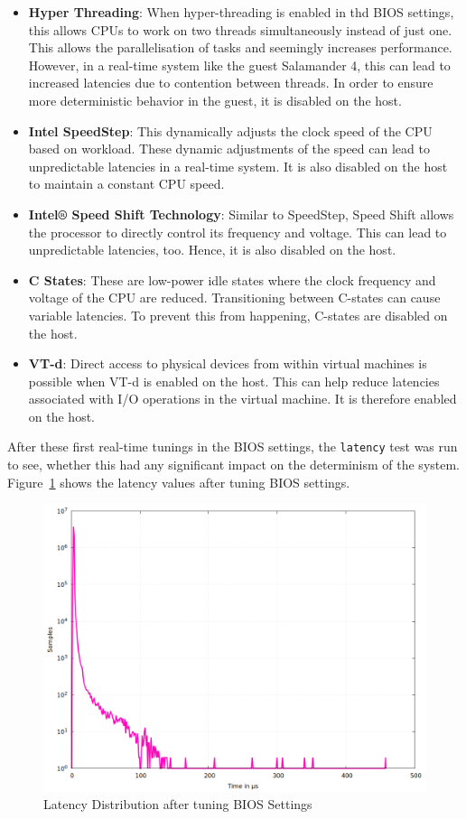 \documentclass[MMR,Master,english]{twbook}
\begin{document}
\begin{itemize}
	\item \textbf{Hyper Threading}: When hyper-threading is enabled in thd BIOS settings, this allows CPUs to work on two threads simultaneously instead of just one. This allows the parallelisation of tasks and seemingly increases performance. However, in a real-time system like the guest Salamander 4, this can lead to increased latencies due to contention between threads. In order to ensure more deterministic behavior in the guest, it is disabled on the host.
	\item \textbf{Intel SpeedStep}: This dynamically adjusts the clock speed of the CPU based on workload. These dynamic adjustments of the speed can lead to unpredictable latencies in a real-time system. It is also disabled on the host to maintain a constant CPU speed.
	\item \textbf{Intel® Speed Shift Technology}: Similar to SpeedStep, Speed Shift allows the processor to directly control its frequency and voltage. This can lead to unpredictable latencies, too. Hence, it is also disabled on the host.
	\item \textbf{C States}: These are low-power idle states where the clock frequency and voltage of the CPU are reduced. Transitioning between C-states can cause variable latencies. To prevent this from happening, C-states are disabled on the host.
	\item \textbf{VT-d}: Direct access to physical devices from within virtual machines is possible when VT-d is enabled on the host. This can help reduce latencies associated with I/O operations in the virtual machine. It is therefore enabled on the host.
\end{itemize}

\noindent After these first real-time tunings in the BIOS settings, the \texttt{latency} test was run to see, whether this had any significant impact on the determinism of the system. Figure~\ref{fig:gnuplot_max_latency_taskset} shows the latency values after tuning BIOS settings.

\begin{figure}[H]
	\centering
	\includegraphics[width=0.7\columnwidth]{masterthesis-documentation/docs/sigmatek/xenomai/2taskset/gnuplot_max_latency_taskset.png}
	\caption[Latency Distribution after tuning BIOS Settings]{Latency Distribution after tuning BIOS Settings}
	\label{fig:gnuplot_max_latency_taskset}
\end{figure}
\end{document}
